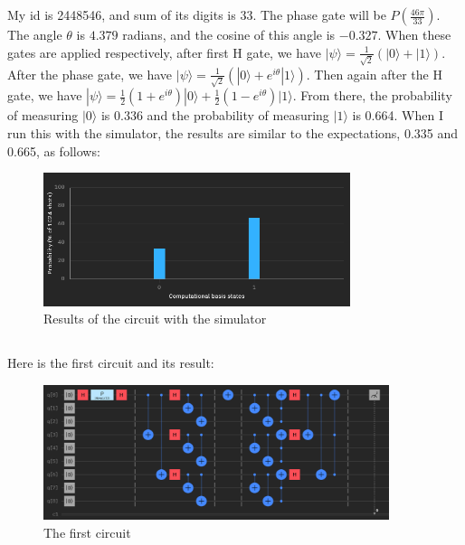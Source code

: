 \documentclass[12pt]{article}
\begin{document}
\subsection*{}
My id is 2448546, and sum of its digits is 33. The phase gate will be $ P(\frac{46 \pi}{33}) $. The angle $ \theta $ is $4.379$ radians, and the cosine of this angle is $ -0.327 $. When these gates are applied respectively, after first H gate, we have $ | \psi \rangle = \frac{1}{\sqrt{2}} (|0\rangle + |1\rangle) $. After the phase gate, we have $ | \psi \rangle = \frac{1}{\sqrt{2}} (|0\rangle + e^{i \theta} |1\rangle) $. Then again after the H gate, we have $ | \psi \rangle = \frac{1}{2} (1 + e^{i \theta}) |0\rangle + \frac{1}{2} (1 - e^{i \theta}) |1\rangle $. From there, the probability of measuring $ |0\rangle $ is 0.336 and the probability of measuring $ |1\rangle $ is 0.664. When I run this with the simulator, the results are similar to the expectations, 0.335 and 0.665, as follows:

\begin{figure}[H]
    \centering
    \includegraphics[width=0.8\textwidth]{simulator.png}
    \caption{Results of the circuit with the simulator}
\end{figure}

\newpage

\subsection*{}

Here is the first circuit and its result:

\begin{figure}[H]
    \centering
    \includegraphics[width=0.9\textwidth]{shor1.png}
    \caption{The first circuit}
\end{figure}
\end{document}
